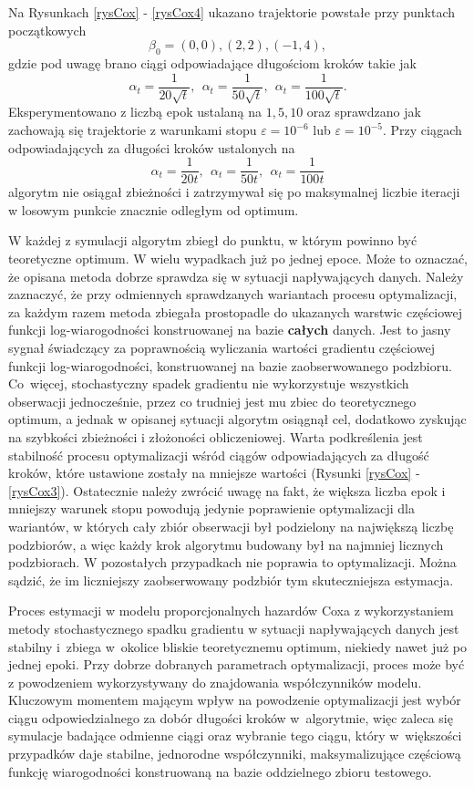 Na Rysunkach \ref{rysCox} - \ref{rysCox4} ukazano trajektorie powstałe przy punktach początkowych
 $$\beta_0 = (0,0), (2,2), (-1,4),$$
 gdzie pod uwagę brano ciągi odpowiadające długościom kroków takie jak 
 $$\alpha_t=\frac{1}{20\sqrt{t}}, \ \ \alpha_t = \frac{1}{50\sqrt{t}}, \ \ \alpha_t = \frac{1}{100\sqrt{t}}.$$ 
 Eksperymentowano z liczbą epok ustalaną na $1,5,10$ oraz sprawdzano jak zachowają się trajektorie z warunkami stopu $\varepsilon=10^{-6}$ lub $\varepsilon=10^{-5}$. Przy ciągach odpowiadających za długości kroków ustalonych na  
 $$\alpha_t=\frac{1}{20t}, \ \ \alpha_t = \frac{1}{50t}, \ \ \alpha_t = \frac{1}{100t}$$
   algorytm nie osiągał zbieżności i zatrzymywał się po maksymalnej liczbie iteracji w losowym punkcie znacznie odległym od optimum.

W każdej z symulacji algorytm zbiegł do punktu, w którym powinno być teoretyczne optimum. W wielu wypadkach już po jednej epoce. Może to oznaczać, że opisana metoda dobrze sprawdza się w sytuacji napływających danych. Należy zaznaczyć, że przy odmiennych sprawdzanych wariantach procesu optymalizacji, za każdym razem metoda zbiegała prostopadle do ukazanych warstwic częściowej funkcji log-wiarogodności konstruowanej na bazie \textbf{całych} danych. Jest to jasny sygnał świadczący za poprawnością wyliczania wartości gradientu częściowej funkcji log-wiarogodności, konstruowanej na bazie zaobserwowanego podzbioru. Co~więcej, stochastyczny spadek gradientu nie wykorzystuje wszystkich obserwacji jednocześnie, przez co trudniej jest mu zbiec do teoretycznego optimum, a jednak w opisanej sytuacji algorytm osiągnął cel, dodatkowo zyskując na szybkości zbieżności i złożoności obliczeniowej. Warta podkreślenia jest stabilność procesu optymalizacji wśród ciągów odpowiadających za długość kroków, które ustawione zostały na mniejsze wartości (Rysunki \ref{rysCox} - \ref{rysCox3}). Ostatecznie należy zwrócić uwagę na fakt, że większa liczba epok i mniejszy warunek stopu powodują jedynie poprawienie optymalizacji dla wariantów, w których cały zbiór obserwacji był podzielony na największą liczbę podzbiorów, a więc każdy krok algorytmu budowany był na najmniej licznych podzbiorach. W pozostałych przypadkach nie poprawia to optymalizacji. Można sądzić, że im liczniejszy zaobserwowany podzbiór tym skuteczniejsza estymacja.

Proces estymacji w modelu proporcjonalnych hazardów Coxa z wykorzystaniem metody stochastycznego spadku gradientu w sytuacji napływających danych jest stabilny i~zbiega w~okolice bliskie teoretycznemu optimum, niekiedy nawet już po jednej epoki. Przy dobrze dobranych parametrach optymalizacji, proces może być z powodzeniem wykorzystywany do znajdowania współczynników modelu. Kluczowym momentem mającym wpływ na powodzenie optymalizacji jest wybór ciągu odpowiedzialnego za dobór długości kroków w~algorytmie, więc zaleca się symulacje badające odmienne ciągi oraz wybranie tego ciągu, który w~większości przypadków daje stabilne, jednorodne współczynniki, maksymalizujące częściową funkcję wiarogodności konstruowaną na bazie oddzielnego zbioru testowego.


